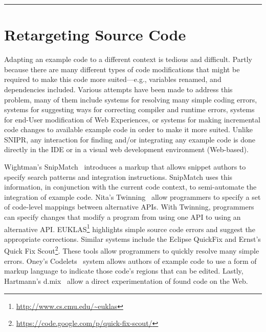 \fancybreak{\pfbreakdisplay}

\section{Retargeting Source Code}
\label{sec:retargetingcode}

Adapting an example code to a different context is tedious and difficult. Partly because there are many different types of code modifications that might be required to make this code more suited---e.g., variables renamed, and dependencies included. Various attempts have been made to address this problem, many of them include systems for resolving many simple coding errors, systems for suggesting ways for correcting compiler and runtime errors, systems for end-User modification of Web Experiences, or systems for making incremental code changes to available example code in order to make it more suited. Unlike \uppercase{SnipR}, any interaction for finding and/or integrating any example code is done directly in the IDE or in a visual web development environment (Web-based).  

Wightman's SnipMatch~\cite{Wightman:2012gc} introduces a markup that allows snippet authors to specify search patterns and integration instructions. SnipMatch uses this information, in conjunction with the current code context, to semi-automate the integration of example code. Nita's Twinning~\cite{Nita:2010en} allow programmers to specify a set of code-level mappings between alternative APIs. With Twinning, programmers can specify changes that modify a program from using one API to using an alternative API. EUKLAS\footnote{\url{http://www.cs.cmu.edu/~euklas}} highlights simple source code errors and suggest the appropriate corrections. Similar systems include the Eclipse QuickFix and Ernst's Quick Fix Scout\footnote{\url{https://code.google.com/p/quick-fix-scout/}}. These tools allow programmers to quickly resolve many simple errors. Oney's Codelets~\cite{Oney:2012ge} system allows authors of example code to use a form of markup language to indicate those code's regions that can be edited. Lastly, Hartmann's d.mix~\cite{Hartmann:2007wf} allow a direct experimentation of found code on the Web.


